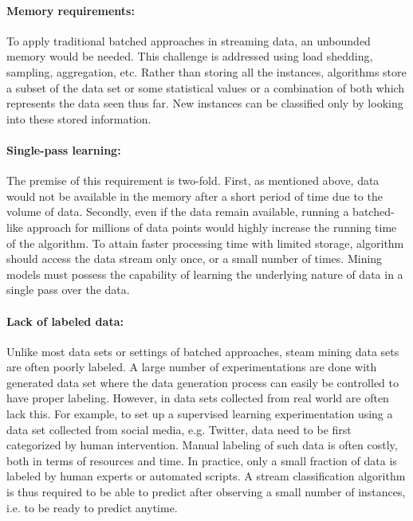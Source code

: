 \paragraph{Memory requirements:}
To apply traditional batched approaches in streaming data, an unbounded memory would be needed. This challenge is  addressed using load shedding, sampling, aggregation, etc. Rather than storing all the instances, algorithms store a subset of the data set or some statistical values or a combination of both which represents the data seen thus far. New instances can be classified only by looking into these stored information. 

\paragraph{Single-pass learning:}
The premise of this requirement is two-fold. First, as mentioned above, data would not be available in the memory after a short period of time due to the volume of data. Secondly, even if the data remain available, running a batched-like approach for millions of data points would highly increase the running time of the algorithm. To attain faster processing time with limited storage, algorithm should access the data stream only once, or a small number of times. Mining models must possess the capability of learning the underlying nature of data in a single pass over the data.

\paragraph{Lack of labeled data:}
Unlike most data sets or settings of batched approaches, steam mining data sets are often poorly labeled. A large number of experimentations are done with generated data set where the data generation process can easily be controlled to have proper labeling. However, in data sets collected from real world are often lack this. For example, to set up a supervised learning experimentation using a data set collected from social media, e.g. Twitter, data need to be first categorized by human intervention. Manual labeling of such data is often costly, both in terms of resources and time. In practice, only a small fraction of data is labeled by human experts or automated scripts. A stream classification algorithm is thus required to be able to predict after observing a small number of instances, i.e. to be ready to predict anytime.

